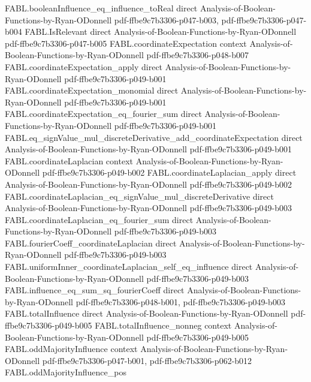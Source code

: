 \begin{theorem}
\proofstep
  {FABL.booleanInfluence_eq_influence_toReal}
  {direct}
  {Analysis-of-Boolean-Functions-by-Ryan-ODonnell}
  {pdf-ffbe9c7b3306-p047-b003,
    pdf-ffbe9c7b3306-p047-b004}
\proofstep
  {FABL.IsRelevant}
  {direct}
  {Analysis-of-Boolean-Functions-by-Ryan-ODonnell}
  {pdf-ffbe9c7b3306-p047-b005}
\proofstep
  {FABL.coordinateExpectation}
  {context}
  {Analysis-of-Boolean-Functions-by-Ryan-ODonnell}
  {pdf-ffbe9c7b3306-p048-b007}
\proofstep
  {FABL.coordinateExpectation_apply}
  {direct}
  {Analysis-of-Boolean-Functions-by-Ryan-ODonnell}
  {pdf-ffbe9c7b3306-p049-b001}
\proofstep
  {FABL.coordinateExpectation_monomial}
  {direct}
  {Analysis-of-Boolean-Functions-by-Ryan-ODonnell}
  {pdf-ffbe9c7b3306-p049-b001}
\proofstep
  {FABL.coordinateExpectation_eq_fourier_sum}
  {direct}
  {Analysis-of-Boolean-Functions-by-Ryan-ODonnell}
  {pdf-ffbe9c7b3306-p049-b001}
\proofstep
  {FABL.eq_signValue_mul_discreteDerivative_add_coordinateExpectation}
  {direct}
  {Analysis-of-Boolean-Functions-by-Ryan-ODonnell}
  {pdf-ffbe9c7b3306-p049-b001}
\proofstep
  {FABL.coordinateLaplacian}
  {context}
  {Analysis-of-Boolean-Functions-by-Ryan-ODonnell}
  {pdf-ffbe9c7b3306-p049-b002}
\proofstep
  {FABL.coordinateLaplacian_apply}
  {direct}
  {Analysis-of-Boolean-Functions-by-Ryan-ODonnell}
  {pdf-ffbe9c7b3306-p049-b002}
\proofstep
  {FABL.coordinateLaplacian_eq_signValue_mul_discreteDerivative}
  {direct}
  {Analysis-of-Boolean-Functions-by-Ryan-ODonnell}
  {pdf-ffbe9c7b3306-p049-b003}
\proofstep
  {FABL.coordinateLaplacian_eq_fourier_sum}
  {direct}
  {Analysis-of-Boolean-Functions-by-Ryan-ODonnell}
  {pdf-ffbe9c7b3306-p049-b003}
\proofstep
  {FABL.fourierCoeff_coordinateLaplacian}
  {direct}
  {Analysis-of-Boolean-Functions-by-Ryan-ODonnell}
  {pdf-ffbe9c7b3306-p049-b003}
\proofstep
  {FABL.uniformInner_coordinateLaplacian_self_eq_influence}
  {direct}
  {Analysis-of-Boolean-Functions-by-Ryan-ODonnell}
  {pdf-ffbe9c7b3306-p049-b003}
\proofstep
  {FABL.influence_eq_sum_sq_fourierCoeff}
  {direct}
  {Analysis-of-Boolean-Functions-by-Ryan-ODonnell}
  {pdf-ffbe9c7b3306-p048-b001,
    pdf-ffbe9c7b3306-p049-b003}
\proofstep
  {FABL.totalInfluence}
  {direct}
  {Analysis-of-Boolean-Functions-by-Ryan-ODonnell}
  {pdf-ffbe9c7b3306-p049-b005}
\proofstep
  {FABL.totalInfluence_nonneg}
  {context}
  {Analysis-of-Boolean-Functions-by-Ryan-ODonnell}
  {pdf-ffbe9c7b3306-p049-b005}
\proofstep
  {FABL.oddMajorityInfluence}
  {context}
  {Analysis-of-Boolean-Functions-by-Ryan-ODonnell}
  {pdf-ffbe9c7b3306-p047-b001,
    pdf-ffbe9c7b3306-p062-b012}
\proofstep
  {FABL.oddMajorityInfluence_pos}

\end{theorem}
